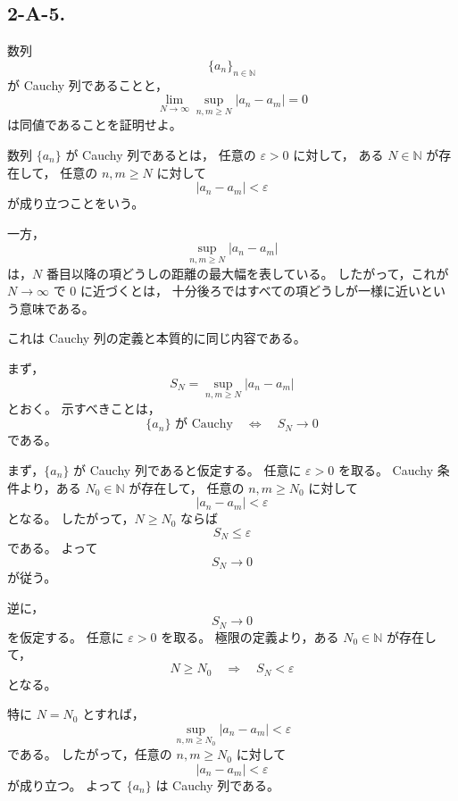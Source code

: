 \subsection{2-A-5.}
\begin{exercise}
	数列
	\[
	\{a_n\}_{n\in\mathbb{N}}
	\]
	が Cauchy 列であることと，
	\[
	\lim_{N\to\infty}
	\sup_{n,m\geq N}|a_n-a_m|
	=0
	\]
	は同値であることを証明せよ。
\end{exercise}

\begin{background}
	数列 \(\{a_n\}\) が Cauchy 列であるとは，
	任意の \(\varepsilon>0\) に対して，
	ある \(N\in\mathbb{N}\) が存在して，
	任意の \(n,m\geq N\) に対して
	\[
	|a_n-a_m|<\varepsilon
	\]
	が成り立つことをいう。
	
	一方，
	\[
	\sup_{n,m\geq N}|a_n-a_m|
	\]
	は，\(N\) 番目以降の項どうしの距離の最大幅を表している。
	したがって，これが \(N\to\infty\) で \(0\) に近づくとは，
	十分後ろではすべての項どうしが一様に近いという意味である。
	
	これは Cauchy 列の定義と本質的に同じ内容である。
\end{background}

\begin{strategy}
	まず，
	\[
	S_N=\sup_{n,m\geq N}|a_n-a_m|
	\]
	とおく。
	示すべきことは，
	\[
	\{a_n\}\text{ が Cauchy}
	\quad\Longleftrightarrow\quad
	S_N\to 0
	\]
	である。
	
	まず，\(\{a_n\}\) が Cauchy 列であると仮定する。
	任意に \(\varepsilon>0\) を取る。
	Cauchy 条件より，ある \(N_0\in\mathbb{N}\) が存在して，
	任意の \(n,m\geq N_0\) に対して
	\[
	|a_n-a_m|<\varepsilon
	\]
	となる。
	したがって，\(N\geq N_0\) ならば
	\[
	S_N\leq \varepsilon
	\]
	である。
	よって
	\[
	S_N\to 0
	\]
	が従う。
	
	逆に，
	\[
	S_N\to 0
	\]
	を仮定する。
	任意に \(\varepsilon>0\) を取る。
	極限の定義より，ある \(N_0\in\mathbb{N}\) が存在して，
	\[
	N\geq N_0
	\quad\Longrightarrow\quad
	S_N<\varepsilon
	\]
	となる。
	
	特に \(N=N_0\) とすれば，
	\[
	\sup_{n,m\geq N_0}|a_n-a_m|<\varepsilon
	\]
	である。
	したがって，任意の \(n,m\geq N_0\) に対して
	\[
	|a_n-a_m|<\varepsilon
	\]
	が成り立つ。
	よって \(\{a_n\}\) は Cauchy 列である。
\end{strategy}